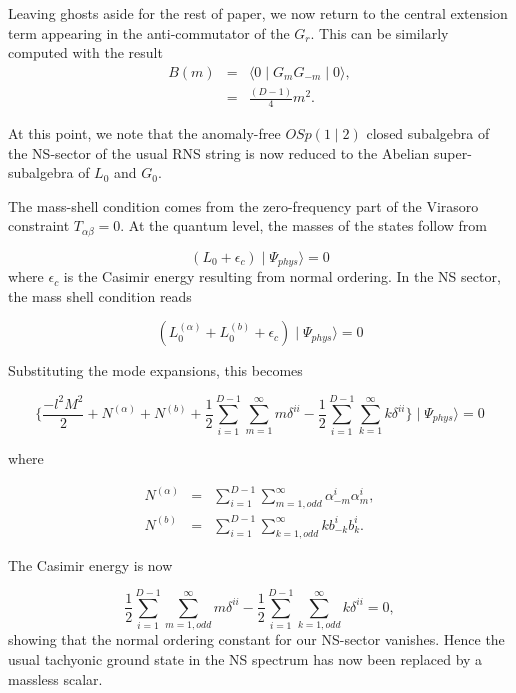 \documentclass[a4paper,a4paper]{article}
\begin{document}
Leaving ghosts aside for the rest of paper, we now return to the
central extension term appearing in the anti-commutator of the
$G_r$. This can be similarly computed with the result
\begin{eqnarray}
B(m)&=&\langle0\mid G_{m}G_{-m}\mid0\rangle, \\
    &=&\frac{(D-1)}{4}m^{2}.
\end{eqnarray}

At this point, we note that the anomaly-free $OSp(1\mid2)$ closed
subalgebra of the NS-sector of the usual RNS string is now reduced
to the Abelian super-subalgebra of $L_{0}$ and $G_{0}$.

The mass-shell condition comes from the zero-frequency part of the
Virasoro constraint $T_{\alpha\beta}=0$.  At the quantum level,
the masses of the states follow from

\begin{equation}
(L_{0}+\epsilon_{c})\mid\Psi_{phys}\rangle=0
\end{equation}
where $\epsilon_{c}$ is the Casimir energy resulting from normal
ordering. In the NS sector, the mass shell condition reads

\begin{equation}
(L_{0}^{(\alpha)}+L_{0}^{(b)}+\epsilon_{c})\mid\Psi_{phys}\rangle=0
\end{equation}

Substituting the mode expansions, this becomes

\begin{equation}
\{\frac{-l^{2}M^{2}}{2}+N^{(\alpha)}+N^{(b)}+
\frac{1}{2}\sum_{i=1}^{D-1}\sum_{m=1}^{\infty}m\delta^{ii}-
\frac{1}{2}\sum_{i=1}^{D-1}\sum_{k=1}^{\infty}k\delta^{ii}
\}\mid\Psi_{phys}\rangle = 0
\end{equation}

where

\begin{eqnarray}
N^{(\alpha)}&=&\sum_{i=1}^{D-1}\sum_{m=1,odd}^{\infty}\alpha_{-m}^{i}\alpha_{m}^{i},\\
N^{(b)}&=&\sum_{i=1}^{D-1}\sum_{k=1,odd}^{\infty}kb_{-k}^{i}b_{k}^{i}.
\end{eqnarray}


The Casimir energy is now

\begin{equation}
\frac{1}{2}\sum_{i=1}^{D-1}\sum_{m=1,odd}^{\infty}m
\delta^{ii}-\frac{1}{2}\sum_{i=1}^{D-1}\sum_{k=1,odd}^{\infty}k\delta^{ii}=0,
\end{equation}
showing that the normal ordering constant for our NS-sector
vanishes. Hence the usual tachyonic ground state in the NS
spectrum has now been replaced by a massless scalar.
\end{document}
